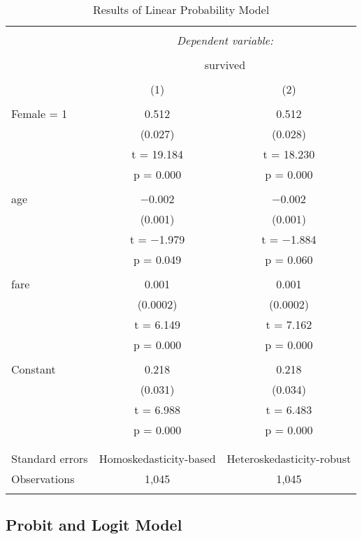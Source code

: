 \documentclass[
  12pt,
]{article}
\begin{document}
\begin{table}[h] \centering 
  \caption{Results of Linear Probability Model} 
  \label{LPM} 
\small 
\begin{tabular}{@{\extracolsep{5pt}}lcc} 
\\[-1.8ex]\hline 
\hline \\[-1.8ex] 
 & \multicolumn{2}{c}{\textit{Dependent variable:}} \\ 
\cline{2-3} 
\\[-1.8ex] & \multicolumn{2}{c}{survived} \\ 
\\[-1.8ex] & (1) & (2)\\ 
\hline \\[-1.8ex] 
 Female = 1 & 0.512 & 0.512 \\ 
  & (0.027) & (0.028) \\ 
  & t = 19.184 & t = 18.230 \\ 
  & p = 0.000 & p = 0.000 \\ 
  & & \\ 
 age & $-$0.002 & $-$0.002 \\ 
  & (0.001) & (0.001) \\ 
  & t = $-$1.979 & t = $-$1.884 \\ 
  & p = 0.049 & p = 0.060 \\ 
  & & \\ 
 fare & 0.001 & 0.001 \\ 
  & (0.0002) & (0.0002) \\ 
  & t = 6.149 & t = 7.162 \\ 
  & p = 0.000 & p = 0.000 \\ 
  & & \\ 
 Constant & 0.218 & 0.218 \\ 
  & (0.031) & (0.034) \\ 
  & t = 6.988 & t = 6.483 \\ 
  & p = 0.000 & p = 0.000 \\ 
  & & \\ 
\hline \\[-1.8ex] 
Standard errors & Homoskedasticity-based & Heteroskedasticity-robust \\ 
Observations & 1,045 & 1,045 \\ 
\hline 
\hline \\[-1.8ex] 
\end{tabular} 
\end{table}

\hypertarget{probit-and-logit-model}{%
\subsection{Probit and Logit Model}\label{probit-and-logit-model}}
\end{document}
